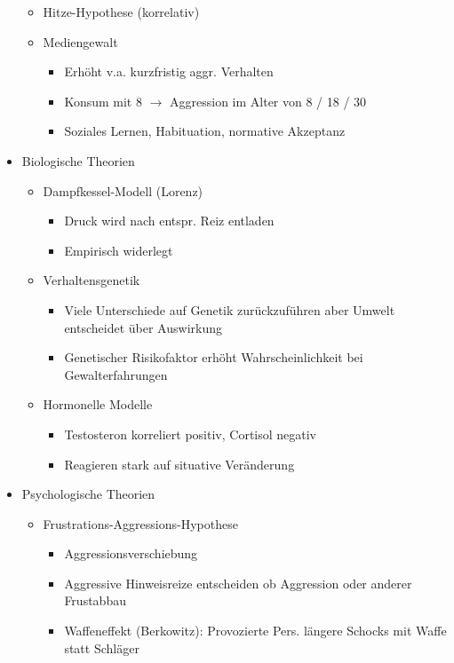 \documentclass[11pt, paper=a4, twocolumn]{scrartcl}
\begin{document}
\begin{itemize}
\begin{itemize}
					\item Hitze-Hypothese (korrelativ)
					\item Mediengewalt
						\begin{itemize}
							\item Erhöht v.a. kurzfristig aggr. Verhalten
							\item Konsum mit 8 $\rightarrow$ Aggression im Alter von 8 / 18 / 30
							\item Soziales Lernen, Habituation, normative Akzeptanz
						\end{itemize}
				\end{itemize}
			\item Biologische Theorien
				\begin{itemize}
					\item Dampfkessel-Modell (Lorenz)
						\begin{itemize}
							\item Druck wird nach entspr. Reiz entladen
							\item Empirisch widerlegt
						\end{itemize}
					\item Verhaltensgenetik
						\begin{itemize}
							\item Viele Unterschiede auf Genetik zurückzuführen aber Umwelt entscheidet über Auswirkung
							\item Genetischer Risikofaktor erhöht Wahrscheinlichkeit bei Gewalterfahrungen
						\end{itemize}
					\item Hormonelle Modelle
						\begin{itemize}
							\item Testosteron korreliert positiv, Cortisol negativ
							\item Reagieren stark auf situative Veränderung
						\end{itemize}
				\end{itemize}
			\item Psychologische Theorien
				\begin{itemize}
					\item Frustrations-Aggressions-Hypothese
						\begin{itemize}
							\item Aggressionsverschiebung
							\item Aggressive Hinweisreize entscheiden ob Aggression oder anderer Frustabbau
							\item Waffeneffekt (Berkowitz): Provozierte Pers. längere Schocks mit Waffe statt Schläger

\end{itemize}
\end{itemize}
\end{itemize}
\end{document}
